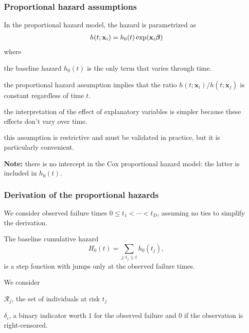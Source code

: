 \documentclass{beamer}
\begin{document}
\begin{frame}
\frametitle{Proportional hazard assumptions}
In the proportional hazard model, the hazard is parametrized as
\begin{align*}
 h(t; \mathbf{x}_i) = h_0(t)\exp(\mathbf{x}_i\boldsymbol {\beta})
\end{align*}
where
\bi \item the baseline hazard $h_0(t)$ is the only term that varies through time.
\item the \alert{proportional hazard} assumption implies that the ratio $h(t; \mathbf{x}_i)/h(t; \mathbf{x}_j)$ is constant regardless of time $t$.
\item the interpretation of the effect of explanatory variables is simpler because these effects don't vary over time.
\item this assumption is restrictive and must be validated in practice, but it is particularly convenient.
\ei

\textbf{Note:} there is no intercept in the Cox proportional hazard model: the latter is included in $h_0(t)$.
\end{frame}
\begin{frame}
 \frametitle{Derivation of the proportional hazards}
 
We consider observed failure times $0 \leq t_1 < \cdots < t_D$, assuming no ties to simplify the derivation.


The baseline cumulative hazard
\[
H_0(t) = \sum_{j: t_j \leq t} h_0(t_j),
\] is a step fonction with jumps only at the observed failure times.

We consider
\bi 
\item $\mathcal{R}_j$, the set of individuals at risk $t_j$
\item $\delta_i$, a binary indicator worth $1$ for the observed failure and $0$ if the observation is right-censored.
\ei

\end{frame}
\end{document}
